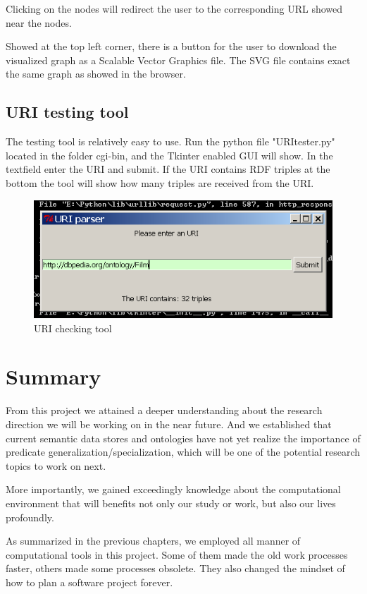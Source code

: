 \documentclass[12pt]{cls}
\begin{document}
Clicking on the nodes will redirect the user to the corresponding URL showed near the nodes.

Showed at the top left corner, there is a button for the user to download the visualized graph as a Scalable Vector Graphics file. The SVG file contains exact the same graph as showed in the browser.

\section{URI testing tool}

The testing tool is relatively easy to use. Run the python file "URItester.py" located in the folder cgi-bin, and the Tkinter enabled GUI will show. In the textfield enter the URI and submit. If the URI contains RDF triples at the bottom the tool will show how many triples are received from the URI.

\begin{figure}[H]
\centering
\includegraphics[width=\textwidth]{figures/page4.png}
\caption{URI checking tool}
\label{URI checking tool}
\end{figure}

\chapter{Summary}

From this project we attained a deeper understanding about the research direction we will be working on in the near future. And we established that current semantic data stores and ontologies have not yet realize the importance of predicate generalization/specialization, which will be one of the potential research topics to work on next. 

More importantly, we gained exceedingly knowledge about the computational environment that will benefits not only our study or work, but also our lives profoundly.

As summarized in the previous chapters, we employed all manner of computational tools in this project. Some of them made the old work processes faster, others made some processes obsolete. They also changed the mindset of how to plan a software project forever.
\end{document}
